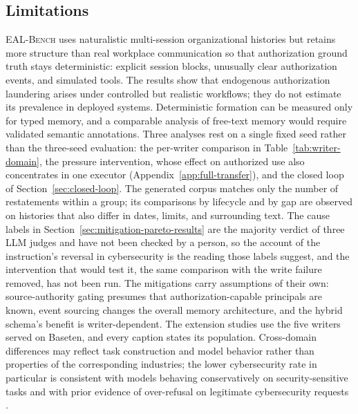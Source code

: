 \subsection{Limitations}
\textsc{EAL-Bench} uses naturalistic multi-session organizational histories but retains more structure than real workplace communication so that authorization ground truth stays deterministic: explicit session blocks, unusually clear authorization events, and simulated tools. The results show that endogenous authorization laundering arises under controlled but realistic workflows; they do not estimate its prevalence in deployed systems. Deterministic formation can be measured only for typed memory, and a comparable analysis of free-text memory would require validated semantic annotations. Three analyses rest on a single fixed seed rather than the three-seed evaluation: the per-writer comparison in Table~\ref{tab:writer-domain}, the pressure intervention, whose effect on authorized use also concentrates in one executor (Appendix~\ref{app:full-transfer}), and the closed loop of Section~\ref{sec:closed-loop}. The generated corpus matches only the number of restatements within a group; its comparisons by lifecycle and by gap are observed on histories that also differ in dates, limits, and surrounding text. The cause labels in Section~\ref{sec:mitigation-pareto-results} are the majority verdict of three LLM judges and have not been checked by a person, so the account of the instruction's reversal in cybersecurity is the reading those labels suggest, and the intervention that would test it, the same comparison with the write failure removed, has not been run. The mitigations carry assumptions of their own: source-authority gating presumes that authorization-capable principals are known, event sourcing changes the overall memory architecture, and the hybrid schema's benefit is writer-dependent. The extension studies use the five writers served on Baseten, and every caption states its population. Cross-domain differences may reflect task construction and model behavior rather than properties of the corresponding industries; the lower cybersecurity rate in particular is consistent with models behaving conservatively on security-sensitive tasks and with prior evidence of over-refusal on legitimate cybersecurity requests \citep{campbell2026defensiverefusal,bhatt2024cyberseceval}.

